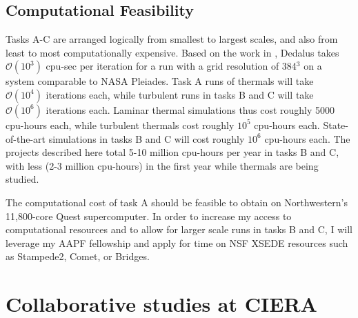 \documentclass[aasms,11pt, longbibliography]{article}
\makeatletter
\renewcommand{\sectionmark}[1]{%
  \markboth{\ifnum \c@secnumdepth>\z@
      \thesection: \hskip 1em\relax
    \fi #1}{}}
\makeatother
\begin{document}
\subsection{Computational Feasibility}
\label{sct:feasibility}
Tasks A-C are arranged logically from smallest to largest scales, and also from least to most computationally expensive.
Based on the work in \citet{anders&brown2017, anders&all2018, anders&all2019, andersLB2019}, Dedalus takes $\mathcal{O}(10^3)$ cpu-sec per iteration for a run with a grid resolution of 384$^3$ on a system comparable to NASA Pleiades.
Task A runs of thermals will take $\mathcal{O}(10^4)$ iterations each, while turbulent runs in tasks B and C will take $\mathcal{O}(10^6)$ iterations each.
Laminar thermal simulations thus cost roughly 5000 cpu-hours each, while turbulent thermals cost roughly $10^5$ cpu-hours each.
State-of-the-art simulations in tasks B and C will cost roughly $10^6$ cpu-hours each.
The projects described here total 5-10 million cpu-hours per year in tasks B and C, with less (2-3 million cpu-hours) in the first year while thermals are being studied.

The computational cost of task A should be feasible to obtain on Northwestern's 11,800-core Quest supercomputer.
In order to increase my access to computational resources and to allow for larger scale runs in tasks B and C, I will leverage my AAPF fellowship and apply for time on NSF XSEDE resources such as Stampede2, Comet, or Bridges.


\section{Collaborative studies at CIERA}
\sectionmark{CIERA}
\vspace{-6pt}
\end{document}
